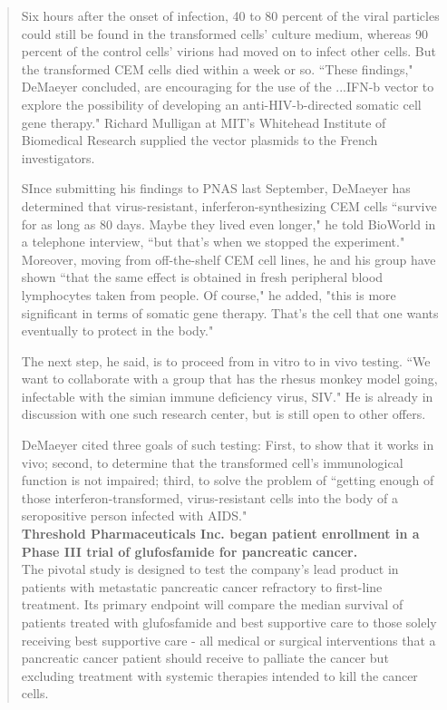 \begin{singlespace}
\begin{small}
\begin{quotation}
Six hours after the onset of infection, 40 to 80 percent of the viral particles could still be found in the transformed cells' culture medium, whereas 90 percent of the control cells' virions had moved on to infect other cells. But the transformed CEM cells died within a week or so. ``These findings," DeMaeyer concluded, are encouraging for the use of the ...IFN-b vector to explore the possibility of developing an anti-HIV-b-directed somatic cell gene therapy." Richard Mulligan at MIT's Whitehead Institute of Biomedical Research supplied the vector plasmids to the French investigators.

SInce submitting his findings to PNAS last September, DeMaeyer has determined that virus-resistant, inferferon-synthesizing CEM cells ``survive for as long as 80 days. Maybe they lived even longer," he told BioWorld in a telephone interview, ``but that's when we stopped the experiment." Moreover, moving from off-the-shelf CEM cell lines, he and his group have shown ``that the same effect is obtained in fresh peripheral blood lymphocytes taken from people. Of course," he added, "this is more
significant in terms of somatic gene therapy. That's the cell that one wants eventually to protect in the body."

The next step, he said, is to proceed from in vitro to in vivo testing. ``We want to collaborate with a group that has the rhesus monkey model going, infectable with the simian immune deficiency virus, SIV." He is already in discussion with one such research center, but is still open to other offers.

DeMaeyer cited three goals of such testing: First, to show that it works in vivo; second, to determine that the transformed cell's
immunological function is not impaired; third, to solve the problem of ``getting enough of those interferon-transformed, virus-resistant cells into the body of a seropositive person infected with AIDS."\\

\noindent \textbf{Threshold Pharmaceuticals Inc. began patient enrollment in a Phase III trial of glufosfamide for pancreatic cancer.} \\

The pivotal study is designed to test the company's lead product in patients with metastatic pancreatic cancer refractory to first-line treatment. Its primary endpoint will compare the median survival of patients treated with glufosfamide and best supportive care to those solely receiving best supportive care - all medical or surgical interventions that a pancreatic cancer patient should receive to palliate the cancer but excluding treatment with systemic therapies intended to kill the cancer cells.


\end{quotation}
\end{small}
\end{singlespace}
